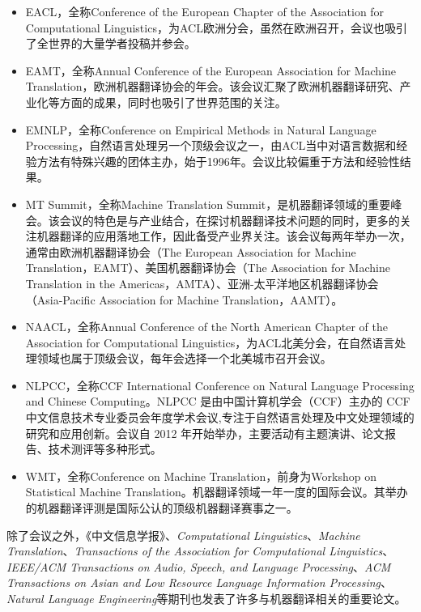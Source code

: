 \begin{itemize}
\vspace{0.5em}
\item EACL，全称Conference of the European Chapter of the Association for Computational Linguistics，为ACL欧洲分会，虽然在欧洲召开，会议也吸引了全世界的大量学者投稿并参会。
\vspace{0.5em}
\item EAMT，全称Annual Conference of the European Association for Machine Translation，欧洲机器翻译协会的年会。该会议汇聚了欧洲机器翻译研究、产业化等方面的成果，同时也吸引了世界范围的关注。
\vspace{0.5em}
\item EMNLP，全称Conference on Empirical Methods in Natural Language Processing，自然语言处理另一个顶级会议之一，由ACL当中对语言数据和经验方法有特殊兴趣的团体主办，始于1996年。会议比较偏重于方法和经验性结果。
\vspace{0.5em}
\item MT Summit，全称Machine Translation Summit，是机器翻译领域的重要峰会。该会议的特色是与产业结合，在探讨机器翻译技术问题的同时，更多的关注机器翻译的应用落地工作，因此备受产业界关注。该会议每两年举办一次，通常由欧洲机器翻译协会（The European Association for Machine Translation，EAMT）、美国机器翻译协会（The Association for Machine Translation in the Americas，AMTA）、亚洲-太平洋地区机器翻译协会（Asia-Pacific Association for Machine Translation，AAMT）。
\vspace{0.5em}
\item NAACL，全称Annual Conference of the North American Chapter of the Association for Computational Linguistics，为ACL北美分会，在自然语言处理领域也属于顶级会议，每年会选择一个北美城市召开会议。
\vspace{0.5em}
\item NLPCC，全称CCF International Conference on Natural Language Processing and Chinese Computing。NLPCC 是由中国计算机学会（CCF）主办的 CCF 中文信息技术专业委员会年度学术会议,专注于自然语言处理及中文处理领域的研究和应用创新。会议自 2012 年开始举办，主要活动有主题演讲、论文报告、技术测评等多种形式。
\vspace{0.5em}
\item WMT，全称Conference on Machine Translation，前身为Workshop on Statistical Machine Translation。机器翻译领域一年一度的国际会议。其举办的机器翻译评测是国际公认的顶级机器翻译赛事之一。
\vspace{0.5em}
\end{itemize}

除了会议之外，《中文信息学报》、\emph{Computational Linguistics}、\emph{Machine Translation}、\emph{Transactions of the Association for Computational Linguistics}、\emph{IEEE/ACM Transactions on Audio, Speech, and Language Processing}、\emph{ACM Transactions on Asian and Low Resource Language Information Processing}、\emph{Natural Language Engineering}等期刊也发表了许多与机器翻译相关的重要论文。










